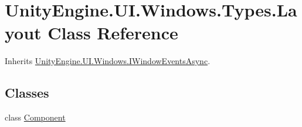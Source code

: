 \hypertarget{class_unity_engine_1_1_u_i_1_1_windows_1_1_types_1_1_layout}{}\section{Unity\+Engine.\+U\+I.\+Windows.\+Types.\+Layout Class Reference}
\label{class_unity_engine_1_1_u_i_1_1_windows_1_1_types_1_1_layout}


Inherits \hyperlink{interface_unity_engine_1_1_u_i_1_1_windows_1_1_i_window_events_async}{Unity\+Engine.\+U\+I.\+Windows.\+I\+Window\+Events\+Async}.

\subsection*{Classes}
\begin{DoxyCompactItemize}
\item 
class \hyperlink{class_unity_engine_1_1_u_i_1_1_windows_1_1_types_1_1_layout_1_1_component}{Component}
\end{DoxyCompactItemize}
